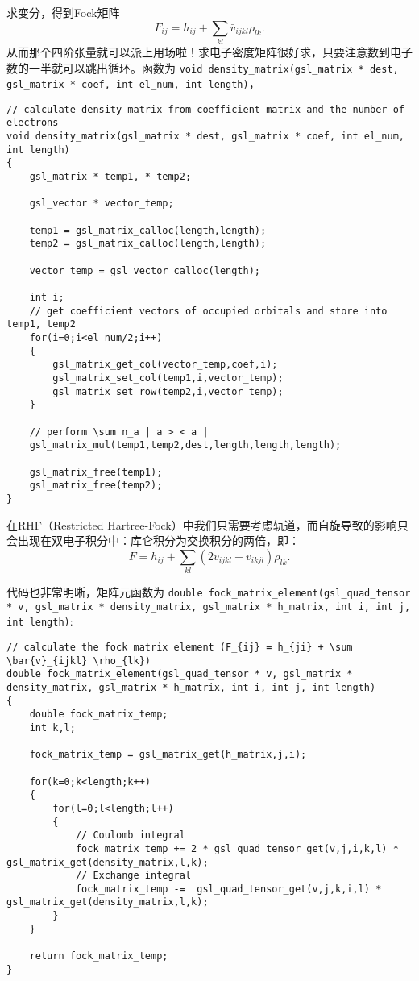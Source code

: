 \documentclass[12pt,a4paper,openany,twoside]{article}
\numberwithin{equation}{section}
\begin{document}
                求变分，得到Fock矩阵
                \begin{equation}
                    F_{ij} = h_{ij} + \sum_{kl} \bar{v}_{ijkl} \rho_{lk}.
                \end{equation}
                从而那个四阶张量就可以派上用场啦！求电子密度矩阵很好求，只要注意数到电子数的一半就可以跳出循环。函数为 \lstinline$void density_matrix(gsl_matrix * dest, gsl_matrix * coef, int el_num, int length)$，
                \begin{lstlisting}
// calculate density matrix from coefficient matrix and the number of electrons
void density_matrix(gsl_matrix * dest, gsl_matrix * coef, int el_num, int length)
{
    gsl_matrix * temp1, * temp2;

    gsl_vector * vector_temp;

    temp1 = gsl_matrix_calloc(length,length);
    temp2 = gsl_matrix_calloc(length,length);

    vector_temp = gsl_vector_calloc(length);

    int i;
    // get coefficient vectors of occupied orbitals and store into temp1, temp2
    for(i=0;i<el_num/2;i++)
    {
        gsl_matrix_get_col(vector_temp,coef,i);
        gsl_matrix_set_col(temp1,i,vector_temp);
        gsl_matrix_set_row(temp2,i,vector_temp);
    }

    // perform \sum n_a | a > < a |
    gsl_matrix_mul(temp1,temp2,dest,length,length,length);

    gsl_matrix_free(temp1);
    gsl_matrix_free(temp2);
}
                \end{lstlisting}
                在RHF（Restricted Hartree-Fock）中我们只需要考虑轨道，而自旋导致的影响只会出现在双电子积分中：库仑积分为交换积分的两倍，即：
                \begin{equation}
                    F = h_{ij} + \sum_{kl} (2 v_{ijkl} - v_{ikjl}) \rho_{lk}.
                \end{equation}

                代码也非常明晰，矩阵元函数为 \lstinline$double fock_matrix_element(gsl_quad_tensor * v, gsl_matrix * density_matrix, gsl_matrix * h_matrix, int i, int j, int length)$:
                \begin{lstlisting}
// calculate the fock matrix element (F_{ij} = h_{ji} + \sum \bar{v}_{ijkl} \rho_{lk})
double fock_matrix_element(gsl_quad_tensor * v, gsl_matrix * density_matrix, gsl_matrix * h_matrix, int i, int j, int length)
{
    double fock_matrix_temp;
    int k,l;

    fock_matrix_temp = gsl_matrix_get(h_matrix,j,i);

    for(k=0;k<length;k++)
    {
        for(l=0;l<length;l++)
        {
            // Coulomb integral
            fock_matrix_temp += 2 * gsl_quad_tensor_get(v,j,i,k,l) * gsl_matrix_get(density_matrix,l,k);
            // Exchange integral 
            fock_matrix_temp -=  gsl_quad_tensor_get(v,j,k,i,l) * gsl_matrix_get(density_matrix,l,k);               
        }
    }

    return fock_matrix_temp;
}
                \end{lstlisting}
\end{document}
